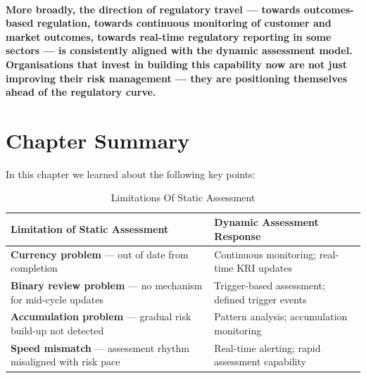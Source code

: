 \paragraph{More broadly, the direction of regulatory travel — towards outcomes-based regulation, towards continuous monitoring of customer and market outcomes, towards real-time regulatory reporting in some sectors — is consistently aligned with the dynamic assessment model. Organisations that invest in building this capability now are not just improving their risk management — they are positioning themselves ahead of the regulatory curve.}

\newpage
\section{Chapter Summary}
In this chapter we learned about the following key points:

\begin{table}[H]
  \centering
  \renewcommand{\arraystretch}{1.5}
  \begin{tabularx}{\textwidth}{ | >{\raggedright\arraybackslash}p{} 
                                | >{\raggedright\arraybackslash}X | }
    \hline
    \textbf{Limitation of Static Assessment} & \textbf{Dynamic Assessment Response} \\
    \hline
    \textbf{Currency problem} — out of date from completion & Continuous monitoring; real-time KRI updates\\
    \hline
    \textbf{Binary review problem} — no mechanism for mid-cycle updates & Trigger-based assessment; defined trigger events\\
    \hline
    \textbf{Accumulation problem} — gradual risk build-up not detected & Pattern analysis; accumulation monitoring\\
    \hline
    \textbf{Speed mismatch} — assessment rhythm misaligned with risk pace & Real-time alerting; rapid assessment capability\\
    \hline
  \end{tabularx}
  \caption{Limitations Of Static Assessment}
\end{table}

